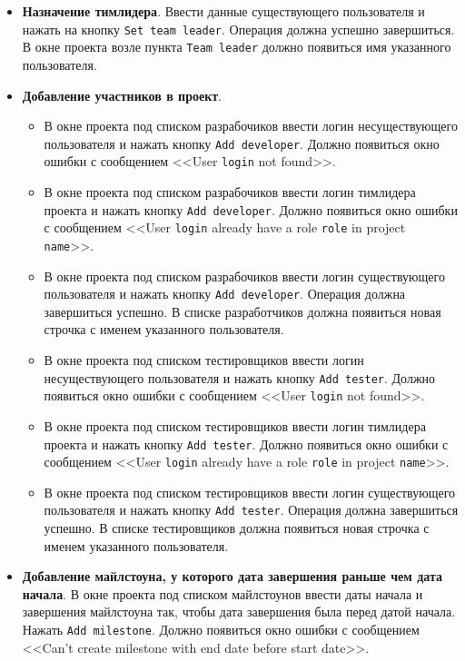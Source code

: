 \begin{itemize}
\item \textbf{Назначение тимлидера}. Ввести данные существующего пользователя и нажать на кнопку \texttt{Set team leader}. Операция должна успешно завершиться. В окне проекта возле пункта \texttt{Team leader} должно появиться имя указанного пользователя.

\item \textbf{Добавление участников в проект}.
	\begin{itemize}
	\item В окне проекта под списком разрабочиков ввести логин несуществующего пользователя и нажать кнопку \texttt{Add developer}. Должно появиться окно ошибки с сообщением <<User \texttt{login} not found>>.
	\item В окне проекта под списком разрабочиков ввести логин тимлидера проекта и нажать кнопку \texttt{Add developer}. Должно появиться окно ошибки с сообщением <<User \texttt{login} already have a role \texttt{role} in project \texttt{name}>>.
	\item В окне проекта под списком разрабочиков ввести логин существующего пользователя и нажать кнопку \texttt{Add developer}. Операция должна завершиться успешно. В списке разработчиков должна появиться новая строчка с именем указанного пользователя.
	\item В окне проекта под списком тестировщиков ввести логин несуществующего пользователя и нажать кнопку \texttt{Add tester}. Должно появиться окно ошибки с сообщением <<User \texttt{login} not found>>.
	\item В окне проекта под списком тестировщиков ввести логин тимлидера проекта и нажать кнопку \texttt{Add tester}. Должно появиться окно ошибки с сообщением <<User \texttt{login} already have a role \texttt{role} in project \texttt{name}>>.
	\item В окне проекта под списком тестировщиков ввести логин существующего пользователя и нажать кнопку \texttt{Add tester}. Операция должна завершиться успешно. В списке тестировщиков должна появиться новая строчка с именем указанного пользователя.
	\end{itemize}

\item \textbf{Добавление майлстоуна, у которого дата завершения раньше чем дата начала}. В окне проекта под списком майлстоунов ввести даты начала и завершения майлстоуна так, чтобы дата завершения была перед датой начала. Нажать \texttt{Add milestone}. Должно появиться окно ошибки с сообщением <<Can't create milestone with end date before start date>>.


\end{itemize}

